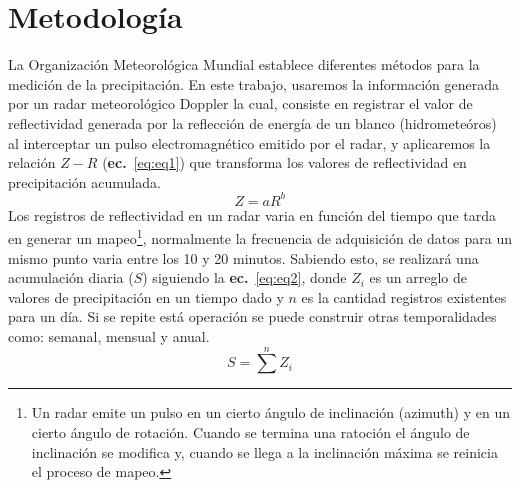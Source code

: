 \documentclass[letterpaper,12pt,oneside]{book}
\newcommand{\refeq}[1]{\textbf{ec.}~\ref{#1}}
\begin{document}
\chapter*{Metodología}
    La Organización Meteorológica Mundial \cite{omm2014guia} establece diferentes métodos para la medición de la precipitación. En este trabajo, usaremos la información generada por un radar meteorológico Doppler la cual, consiste en registrar el valor de reflectividad generada por la reflección de energía de un blanco (hidrometeóros) al interceptar un pulso electromagnético emitido por el radar,  y aplicaremos la relación $Z-R$ (\refeq{eq:eq1}) que transforma los valores de reflectividad en precipitación acumulada.
    \begin{equation}
        Z= aR^b
        \label{eq:eq1}
    \end{equation}
    Los registros de reflectividad en un radar varia en función del tiempo que tarda en generar un mapeo\footnote{Un radar emite un pulso en un cierto ángulo de inclinación (azimuth) y en un cierto ángulo de rotación. Cuando se termina una ratoción el ángulo de inclinación se modifica y, cuando se llega a la inclinación máxima se reinicia el proceso de mapeo.}, normalmente la frecuencia de adquisición de datos para un mismo punto varia entre los 10 y 20 minutos. Sabiendo esto, se realizará una acumulación diaria ($S$) siguiendo la \refeq{eq:eq2}, donde $Z_i$ es un arreglo de valores de precipitación en un tiempo dado y $n$ es la cantidad registros existentes para un día. Si se repite está operación se puede construir otras temporalidades como: semanal, mensual y anual.
    \begin{equation}
        S= \sum^n Z_i
        \label{eq:eq2}
    \end{equation}
    
\end{document}
